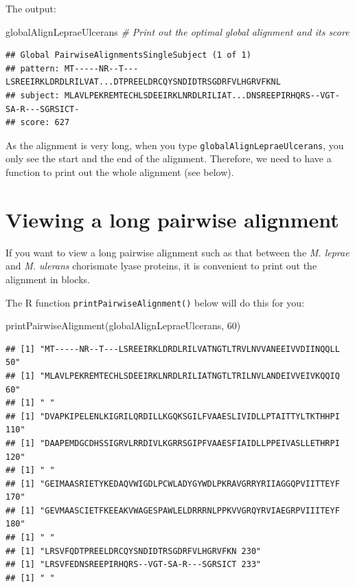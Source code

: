 \documentclass[
]{book}
\newenvironment{Shaded}{\begin{snugshade}}{\end{snugshade}}
\newcommand{\CommentTok}[1]{\textcolor[rgb]{0.56,0.35,0.01}{\textit{#1}}}
\newcommand{\DecValTok}[1]{\textcolor[rgb]{0.00,0.00,0.81}{#1}}
\newcommand{\FunctionTok}[1]{\textcolor[rgb]{0.00,0.00,0.00}{#1}}
\newcommand{\NormalTok}[1]{#1}
\begin{document}
The output:

\begin{Shaded}
\begin{Highlighting}[]
\NormalTok{globalAlignLepraeUlcerans }\CommentTok{\# Print out the optimal global alignment and its score}
\end{Highlighting}
\end{Shaded}

\begin{verbatim}
## Global PairwiseAlignmentsSingleSubject (1 of 1)
## pattern: MT-----NR--T---LSREEIRKLDRDLRILVAT...DTPREELDRCQYSNDIDTRSGDRFVLHGRVFKNL
## subject: MLAVLPEKREMTECHLSDEEIRKLNRDLRILIAT...DNSREEPIRHQRS--VGT-SA-R---SGRSICT-
## score: 627
\end{verbatim}

As the alignment is very long, when you type \texttt{globalAlignLepraeUlcerans}, you only see the start and the end of the alignment. Therefore, we need to have a function to print out the whole alignment (see below).

\hypertarget{viewing-a-long-pairwise-alignment}{%
\section{Viewing a long pairwise alignment}\label{viewing-a-long-pairwise-alignment}}

If you want to view a long pairwise alignment such as that between the \emph{M. leprae} and \emph{M. ulerans} chorismate lyase proteins, it is convenient to print out the alignment in blocks.

The R function \texttt{printPairwiseAlignment()} below will do this for you:

\begin{Shaded}
\begin{Highlighting}[]
\FunctionTok{printPairwiseAlignment}\NormalTok{(globalAlignLepraeUlcerans, }\DecValTok{60}\NormalTok{)}
\end{Highlighting}
\end{Shaded}

\begin{verbatim}
## [1] "MT-----NR--T---LSREEIRKLDRDLRILVATNGTLTRVLNVVANEEIVVDIINQQLL 50"
## [1] "MLAVLPEKREMTECHLSDEEIRKLNRDLRILIATNGTLTRILNVLANDEIVVEIVKQQIQ 60"
## [1] " "
## [1] "DVAPKIPELENLKIGRILQRDILLKGQKSGILFVAAESLIVIDLLPTAITTYLTKTHHPI 110"
## [1] "DAAPEMDGCDHSSIGRVLRRDIVLKGRRSGIPFVAAESFIAIDLLPPEIVASLLETHRPI 120"
## [1] " "
## [1] "GEIMAASRIETYKEDAQVWIGDLPCWLADYGYWDLPKRAVGRRYRIIAGGQPVIITTEYF 170"
## [1] "GEVMAASCIETFKEEAKVWAGESPAWLELDRRRNLPPKVVGRQYRVIAEGRPVIIITEYF 180"
## [1] " "
## [1] "LRSVFQDTPREELDRCQYSNDIDTRSGDRFVLHGRVFKN 230"
## [1] "LRSVFEDNSREEPIRHQRS--VGT-SA-R---SGRSICT 233"
## [1] " "
\end{verbatim}
\end{document}
